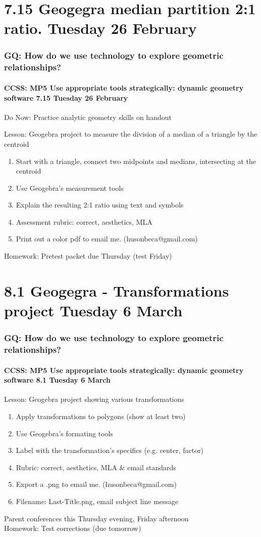 \documentclass{beamer}
\begin{document}
\section{7.15 Geogegra median partition 2:1 ratio. Tuesday 26 February}
  \frame
  {
    \frametitle{GQ: How do we use technology to explore geometric relationships?}
    \framesubtitle{CCSS: MP5 Use appropriate tools strategically: dynamic geometry software \hfill \alert{7.15 Tuesday 26 February}}

    Do Now: Practice analytic geometry skills on handout
    \begin{block}{Lesson: Geogebra project to measure the division of a median of a triangle by the centroid}
      \begin{enumerate}
        \item Start with a triangle, connect two midpoints and medians, intersecting at the centroid
        \item Use Geogebra's measurement tools
        \item Explain the resulting 2:1 ratio using text and symbols
        \item Assessment rubric: correct, aesthetics, MLA
        \item Print out a color pdf to email me. (husonbeca@gmail.com)
      \end{enumerate}
    \end{block}
    Homework: Pretest packet due Thursday \alert{(test Friday)}
  }

\section{8.1 Geogegra - Transformations project Tuesday 6 March}
  \frame
  {
    \frametitle{GQ: How do we use technology to explore geometric relationships?}
    \framesubtitle{CCSS: MP5 Use appropriate tools strategically: dynamic geometry software \hfill \alert{8.1 Tuesday 6 March}}

    \begin{block}{Lesson: Geogebra project showing various transformations}
      \begin{enumerate}
        \item Apply transformations to polygons (show at least two)
        \item Use Geogebra's formating tools
        \item Label with the transformation's specifics (e.g. center, factor)
        \item Rubric: correct, aesthetics, \alert{MLA \& email standards}
        \item Export a .png to email me. (husonbeca@gmail.com)
        \item Filename: Last-Title.png, email subject line message
      \end{enumerate}
    \end{block}
    \alert{Parent conferences this Thursday evening, Friday afternoon}\\
    Homework: Test corrections  (due tomorrow)
  }
\end{document}
